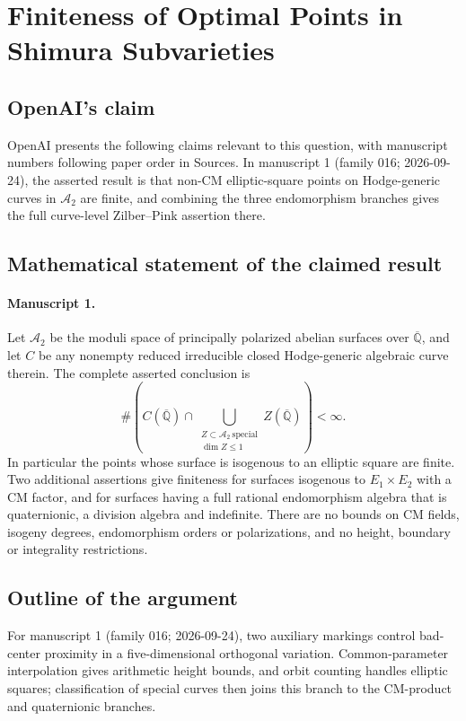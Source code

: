 \documentclass[11pt]{article}
\begin{document}
\section*{Finiteness of Optimal Points in Shimura Subvarieties}

\subsection{OpenAI's claim}
OpenAI presents the following claims relevant to this question, with manuscript numbers following paper order in Sources. In manuscript 1 (family 016; 2026-09-24), the asserted result is that non-CM elliptic-square points on Hodge-generic curves in $\mathcal A_2$ are finite, and combining the three endomorphism branches gives the full curve-level Zilber--Pink assertion there.

\subsection{Mathematical statement of the claimed result}
\paragraph{Manuscript 1.}
Let $\mathcal A_2$ be the moduli space of principally polarized abelian surfaces over $\overline{\mathbb Q}$, and let $C$ be any nonempty reduced irreducible closed Hodge-generic algebraic curve therein. The complete asserted conclusion is
\[
 \#\left(C(\overline{\mathbb Q})\cap
 \bigcup_{\substack{Z\subset\mathcal A_2\ \mathrm{special}\\\dim Z\le1}}
 Z(\overline{\mathbb Q})\right)<\infty.
\]
In particular the points whose surface is isogenous to an elliptic square are finite. Two additional assertions give finiteness for surfaces isogenous to $E_1\times E_2$ with a CM factor, and for surfaces having a full rational endomorphism algebra that is quaternionic, a division algebra and indefinite. There are no bounds on CM fields, isogeny degrees, endomorphism orders or polarizations, and no height, boundary or integrality restrictions.

\subsection{Outline of the argument}
For manuscript 1 (family 016; 2026-09-24), two auxiliary markings control bad-center proximity in a five-dimensional orthogonal variation. Common-parameter interpolation gives arithmetic height bounds, and orbit counting handles elliptic squares; classification of special curves then joins this branch to the CM-product and quaternionic branches.
\end{document}

